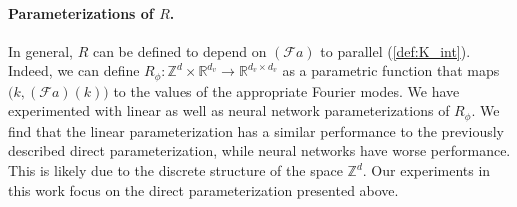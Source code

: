 \documentclass{article} %
\newcommand{\R}{\mathbb{R}}
\newcommand{\cG}{\mathcal{F}}
\begin{document}




\paragraph{Parameterizations of $R$.} 
In general, $R$ can be defined to depend on $(\cG a)$ to parallel (\ref{def:K_int}).
Indeed, we can define $R_\phi: \mathbb{Z}^d \times \R^{d_v} \to \R^{d_v \times d_v}$
as a parametric function that maps \(\bigl(k,(\cG a)(k))\) to the values of the appropriate Fourier modes. We have experimented with linear as well as neural network parameterizations of $R_\phi$.
We find that the linear parameterization has a similar performance to the previously described direct parameterization,
while neural networks have worse performance. This is likely due to the discrete structure of the space $\mathbb{Z}^d$.  
Our experiments in this work focus on the direct parameterization presented above.
\end{document}
